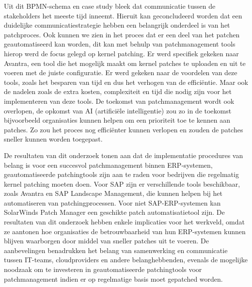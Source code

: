 Uit dit BPMN-schema en case study bleek dat communicatie tussen de stakeholders het meeste tijd inneemt. Hieruit kan geconcludeerd worden dat een duidelijke communicatiestrategie hebben een belangrijk onderdeel is van het patchproces. Ook kunnen we zien in het proces dat er een deel van het patchen
geautomatiseerd kan worden, dit kan met behulp van patchmanagement tools hierop werd de focus gelegd op kernel patching. Er werd specifiek gekeken naar Avantra, een tool die het mogelijk maakt om kernel patches te uploaden en uit te voeren met de juiste
configuratie. Er werd gekeken naar de voordelen van deze tools, zoals het besparen van tijd en dus het verhogen van de efficiëntie. Maar ook de nadelen zoals de extra kosten, complexiteit en tijd die nodig zijn voor het implementeren van deze tools.
De toekomst van patchmanagement wordt ook overlopen, de opkomst van AI (artificiële intelligentie) zou zo in de toekomst bijvoorbeeld organisaties kunnen helpen om een prioriteit toe te kennen aan patches. Zo zou het proces nog efficiënter kunnen verlopen en zouden de patches sneller kunnen worden toegepast.

De resultaten van dit onderzoek tonen aan dat de implementatie procedures van belang is voor een succesvol patchmanagement binnen ERP-systemen, geautomatiseerde patchingtools zijn aan te raden voor bedrijven die
regelmatig kernel patching moeten doen. Voor SAP zijn er verschillende tools beschikbaar, zoals Avantra en SAP Landscape Management, die kunnen helpen bij het automatiseren van patchingprocessen. 
Voor niet SAP-ERP-systemen kan SolarWinds Patch Manager een geschikte patch automatisatietool zijn. De resultaten van dit onderzoek hebben enkele implicaties voor het werkveld, omdat ze aantonen hoe organisaties de betrouwbaarheid
van hun ERP-systemen kunnen blijven waarborgen door middel van sneller patches uit te voeren. De aanbevelingen benadrukken het belang van samenwerking en communicatie tussen IT-teams, cloudproviders en andere belanghebbenden, evenals de mogelijke noodzaak om te investeren in geautomatiseerde patchingtools voor patchmanagement indien er op regelmatige basis moet gepatched worden.
